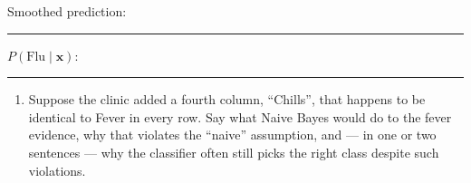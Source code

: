 \documentclass[
  11pt,
]{article}
\providecommand{\tightlist}{%
  \setlength{\itemsep}{0pt}\setlength{\parskip}{0pt}}
\newcommand{\answerspace}[1]{\par\vspace*{#1}}  %
\newcommand{\blank}[1][1.2in]{\rule{#1}{0.4pt}}
\begin{document}
Smoothed prediction:
\blank[0.8in]\quad \(P(\text{Flu} \mid \mathbf{x})\): \blank[0.8in]

\answerspace{2.4in}

\begin{enumerate}
\def\labelenumi{(\alph{enumi})}
\setcounter{enumi}{2}
\tightlist
\item
  Suppose the clinic added a fourth column, ``Chills'', that happens to
  be identical to Fever in every row. Say what Naive Bayes would do to
  the fever evidence, why that violates the ``naive'' assumption, and
  --- in one or two sentences --- why the classifier often still picks
  the right class despite such violations.
\end{enumerate}

\answerspace{1.8in}
\end{document}
